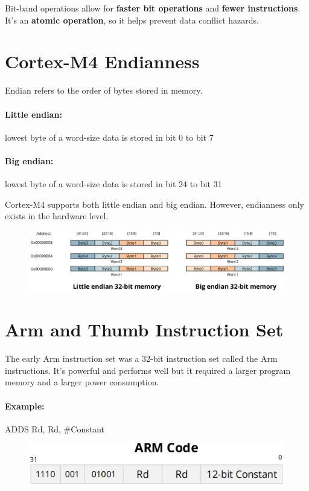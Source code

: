 Bit-band operations allow for \textbf{faster bit operations} and \textbf{fewer instructions}. It's an \textbf{atomic operation}, so it helps prevent data conflict hazards.

\newpage
\section{Cortex-M4 Endianness}

Endian refers to the order of bytes stored in memory.

\paragraph{Little endian:} lowest byte of a word-size data is stored in bit 0 to bit 7
\paragraph{Big endian: } lowest byte of a word-size data is stored in bit 24 to bit 31


Cortex-M4 supports both little endian and big endian. However, endianness only exists in the hardware level.


\begin{figure}[H]
    \centering
    \includegraphics[width=1\linewidth]{img/image23.png}
\end{figure}


\section{Arm and Thumb Instruction Set}

The early Arm instruction set was a 32-bit instruction set called the Arm instructions. It's powerful and
performs well but it required a larger program memory and a larger power consumption.

\paragraph{Example: } ADDS Rd, Rd, \#Constant


\begin{figure}[H]
    \centering
    \includegraphics[width=0.7\linewidth]{img/image25.png}
\end{figure}

